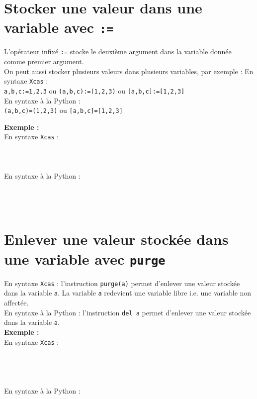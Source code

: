 \documentclass[12pt,a4paper]{book}
\begin{document}
\begin{giacjshere}
\section{Stocker une valeur dans une variable avec {\tt :=}}
L'op\'erateur infix\'e {\tt :=} stocke le deuxi\`eme argument dans la variable 
donn\'ee comme premier argument.\\
On peut aussi stocker plusieurs valeurs dans plusieurs variables, par exemple :
En syntaxe {\tt Xcas} :\\
{\tt a,b,c:=1,2,3} ou {\tt (a,b,c):=(1,2,3)} ou {\tt [a,b,c]:=[1,2,3]} \\
En syntaxe \`a la Python :\\
{\tt (a,b,c)=(1,2,3)} ou {\tt [a,b,c]=[1,2,3]}

{\bf Exemple :}\\ 
En syntaxe {\tt Xcas} :\\
\\
\\
\\
En syntaxe \`a la Python :\\
\\
\\
\\

\section{Enlever une valeur stock\'ee dans une variable avec {\tt purge}}
En syntaxe {\tt Xcas} : l'instruction {\tt purge(a)} permet d'enlever une valeur stock\'ee dans la variable {\tt a}. La variable {\tt a} redevient une variable libre i.e. une variable non affect\'ee.\\
En syntaxe \`a la Python : l'instruction {\tt del a} permet d'enlever une 
valeur stock\'ee dans la variable {\tt a}.\\
{\bf Exemple :}\\ 
En syntaxe {\tt Xcas} :\\
\\
\\
\\
\\
En syntaxe \`a la Python :\\
\\
\\
\\

\end{giacjshere}
\end{document}
